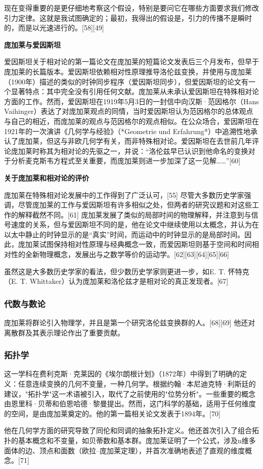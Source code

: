 现在变得重要的是更仔细地考察这个假设，特别是要问它在哪些方面要求我们修改引力定律。这就是我试图确定的；最初，我得出的假设是，引力的传播不是瞬时的，而是以光速进行的。[58][49]

\textbf{庞加莱与爱因斯坦}

爱因斯坦关于相对论的第一篇论文在庞加莱的短篇论文发表后三个月发布，但早于庞加莱的长篇版本。爱因斯坦依赖相对性原理推导洛伦兹变换，并使用与庞加莱（1900年）描述的类似的时钟同步程序（爱因斯坦同步），但爱因斯坦的论文有一个显著特点：其中完全没有引用任何文献。庞加莱从未承认爱因斯坦在特殊相对论方面的工作。然而，爱因斯坦在1919年5月3日的一封信中向汉斯·范因格尔（Hans Vaihinger）表达了对庞加莱观点的同情，当时爱因斯坦认为范因格尔的总体观点与自己的相近，而庞加莱的观点与范因格尔的观点相似。在公众场合，爱因斯坦在1921年的一次演讲《几何学与经验》（*Geometrie und Erfahrung*）中追溯性地承认了庞加莱，但这与非欧几何学有关，而非特殊相对论。爱因斯坦在去世前几年评论庞加莱时称其为相对论的先驱之一，并说：“洛伦兹早已认识到他命名的变换对于分析麦克斯韦方程式至关重要，而庞加莱则进一步加深了这一见解……”[60]

\textbf{关于庞加莱和相对论的评价} 

庞加莱在特殊相对论发展中的工作得到了广泛认可，[55] 尽管大多数历史学家强调，尽管庞加莱的工作与爱因斯坦有许多相似之处，但两者的研究议题和对这些工作的解释截然不同。[61] 庞加莱发展了类似的局部时间的物理解释，并注意到与信号速度的关系，但与爱因斯坦不同的是，他在论文中继续使用以太概念，并认为在以太中静止的时钟显示的是“真实”时间，而运动中的时钟显示的是局部时间。因此，庞加莱试图保持相对性原理与经典概念一致，而爱因斯坦则基于空间和时间相对性的全新物理概念，发展出与之数学等价的运动学。[62][63][64][65][66]

虽然这是大多数历史学家的看法，但少数历史学家则更进一步，如E. T. 怀特克（E. T. Whittaker）认为庞加莱和洛伦兹才是相对论的真正发现者。[67]
\subsubsection{代数与数论}
庞加莱将群论引入物理学，并且是第一个研究洛伦兹变换群的人。[68][69] 他还对离散群及其表示理论作出了重要贡献。
\subsubsection{拓扑学}
这一学科在费利克斯·克莱因的《埃尔朗根计划》（1872年）中得到了明确的定义：任意连续变换的几何不变量，一种几何学。根据约翰·本尼迪克特·利斯廷的建议，"拓扑学"这一术语被引入，取代了之前使用的"位势分析"。一些重要的概念由恩里科·贝蒂和伯恩哈德·黎曼提出。然而，这门科学的基础，适用于任何维度的空间，是由庞加莱奠定的。他的第一篇相关论文发表于1894年。[70]

他在几何学方面的研究导致了同伦和同调的抽象拓扑定义。他还首次引入了组合拓扑的基本概念和不变量，如贝蒂数和基本群。庞加莱证明了一个公式，涉及n维多面体的边、顶点和面数（欧拉–庞加莱定理），并首次准确地表述了直观的维度概念。[71]